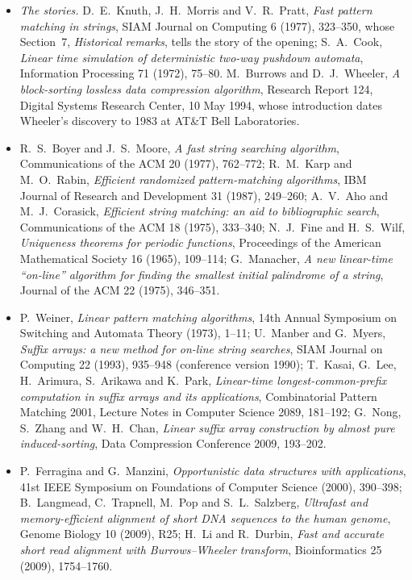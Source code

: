 \begin{itemize}
\item \emph{The stories.} D.~E.~Knuth, J.~H.~Morris and V.~R.~Pratt, \emph{Fast pattern matching in strings}, SIAM Journal on Computing 6 (1977), 323--350, whose Section~7, \emph{Historical remarks}, tells the story of the opening; S.~A.~Cook, \emph{Linear time simulation of deterministic two-way pushdown automata}, Information Processing 71 (1972), 75--80. M.~Burrows and D.~J.~Wheeler, \emph{A block-sorting lossless data compression algorithm}, Research Report 124, Digital Systems Research Center, 10 May 1994, whose introduction dates Wheeler's discovery to 1983 at AT\&T Bell Laboratories.
\item R.~S.~Boyer and J.~S.~Moore, \emph{A fast string searching algorithm}, Communications of the ACM 20 (1977), 762--772; R.~M.~Karp and M.~O.~Rabin, \emph{Efficient randomized pattern-matching algorithms}, IBM Journal of Research and Development 31 (1987), 249--260; A.~V.~Aho and M.~J.~Corasick, \emph{Efficient string matching: an aid to bibliographic search}, Communications of the ACM 18 (1975), 333--340; N.~J.~Fine and H.~S.~Wilf, \emph{Uniqueness theorems for periodic functions}, Proceedings of the American Mathematical Society 16 (1965), 109--114; G.~Manacher, \emph{A new linear-time ``on-line'' algorithm for finding the smallest initial palindrome of a string}, Journal of the ACM 22 (1975), 346--351.
\item P.~Weiner, \emph{Linear pattern matching algorithms}, 14th Annual Symposium on Switching and Automata Theory (1973), 1--11; U.~Manber and G.~Myers, \emph{Suffix arrays: a new method for on-line string searches}, SIAM Journal on Computing 22 (1993), 935--948 (conference version 1990); T.~Kasai, G.~Lee, H.~Arimura, S.~Arikawa and K.~Park, \emph{Linear-time longest-common-prefix computation in suffix arrays and its applications}, Combinatorial Pattern Matching 2001, Lecture Notes in Computer Science 2089, 181--192; G.~Nong, S.~Zhang and W.~H.~Chan, \emph{Linear suffix array construction by almost pure induced-sorting}, Data Compression Conference 2009, 193--202.
\item P.~Ferragina and G.~Manzini, \emph{Opportunistic data structures with applications}, 41st IEEE Symposium on Foundations of Computer Science (2000), 390--398; B.~Langmead, C.~Trapnell, M.~Pop and S.~L.~Salzberg, \emph{Ultrafast and memory-efficient alignment of short DNA sequences to the human genome}, Genome Biology 10 (2009), R25; H.~Li and R.~Durbin, \emph{Fast and accurate short read alignment with Burrows--Wheeler transform}, Bioinformatics 25 (2009), 1754--1760.

\end{itemize}
